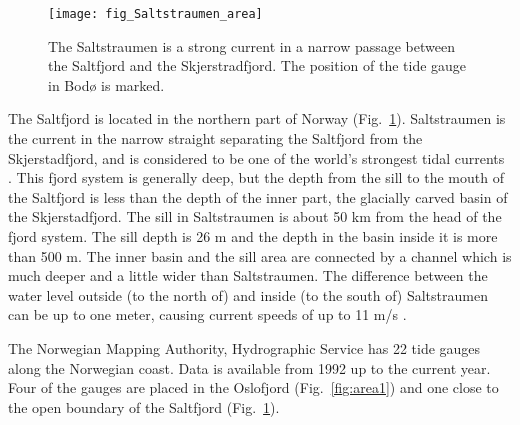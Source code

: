 \begin{figure}[!t]
\centering
\texttt{[image: fig\_Saltstraumen\_area]}
\caption{The Saltstraumen is a strong current in a narrow passage between the Saltfjord and the Skjerstradfjord. The position of the tide gauge in Bod{\o} is marked.}
\label{fig:area2}
\end{figure}

The Saltfjord is located in the northern part of Norway (Fig.~\ref{fig:area2}). Saltstraumen is the current in the narrow straight separating the Saltfjord from the Skjerstadfjord, and is considered to be one of the world's strongest tidal currents \cite[]{gjevik09}. This fjord system is generally deep, but the depth from the sill to the mouth of the Saltfjord is less than the depth of the inner part, the glacially carved basin of the Skjerstadfjord. The sill in Saltstraumen is about 50 km from the head of the fjord system. The sill depth is 26 m and the depth in the basin inside it is more than 500 m. The inner basin and the sill area are connected by a channel which is much deeper and a little wider than Saltstraumen. The difference between the water level outside (to the north of) and inside (to the south of) Saltstraumen can be up to one meter, causing current speeds of up to 11 m/s \cite[]{eliassen01}.

The Norwegian Mapping Authority, Hydrographic Service has 22 tide gauges along the Norwegian coast. Data is available from 1992 up to the current year. Four of the gauges are placed in the Oslofjord  (Fig.~\ref{fig:area1}) and one close to the open boundary of the Saltfjord (Fig.~\ref{fig:area2}).

